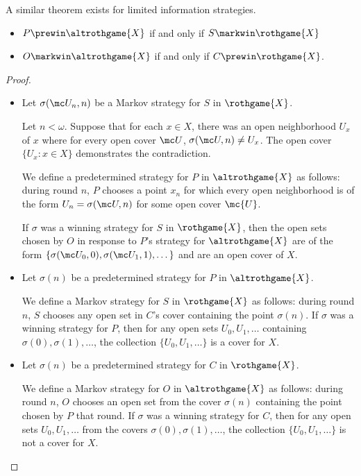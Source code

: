   A similar theorem exists for limited information strategies.

  \begin{thm}
    \begin{itemize}
      \item $P\prewin\altrothgame{X}$ if and only if $S\markwin\rothgame{X}$
      \item $O\markwin\altrothgame{X}$ if and only if $C\prewin\rothgame{X}$.
    \end{itemize}
  \end{thm}

  \begin{proof}

    \begin{itemize}
      \item
      Let $\sigma(\mc U_n,n)$ be a Markov strategy for $S$ in $\rothgame{X}$. 

      Let $n<\omega$. Suppose that for each $x\in X$, there was an open neighborhood $U_x$ of $x$ where for every open cover $\mc U$, $\sigma(\mc U,n)\not=U_x$. The open cover $\{U_x : x\in X\}$ demonstrates the contradiction.

      We define a predetermined strategy for $P$ in $\altrothgame{X}$ as follows: during round $n$, $P$ chooses a point $x_n$ for which every open neighborhood is of the form $U_n = \sigma(\mc U,n)$ for some open cover $\mc{U}$.

      If $\sigma$ was a winning strategy for $S$ in $\rothgame{X}$, then the open sets chosen by $O$ in response to $P$'s strategy for $\altrothgame{X}$ are of the form $\{\sigma(\mc U_0,0),\sigma(\mc U_1,1),\dots\}$ and are an open cover of $X$.

      \item
      Let $\sigma(n)$ be a predetermined strategy for $P$ in $\altrothgame{X}$.

      We define a Markov strategy for $S$ in $\rothgame{X}$ as follows: during round $n$, $S$ chooses any open set in $C$'s cover containing the point $\sigma(n)$. If $\sigma$ was a winning strategy for $P$, then for any open sets $U_0,U_1,\dots$ containing $\sigma(0),\sigma(1),\dots$, the collection $\{U_0,U_1,\dots\}$ is a cover for $X$.

      \item
      Let $\sigma(n)$ be a predetermined strategy for $C$ in $\rothgame{X}$.

      We define a Markov strategy for $O$ in $\altrothgame{X}$ as follows: during round $n$, $O$ chooses an open set from the cover $\sigma(n)$ containing the point chosen by $P$ that round. If $\sigma$ was a winning strategy for $C$, then for any open sets $U_0,U_1,\dots$ from the covers $\sigma(0),\sigma(1),\dots$, the collection $\{U_0,U_1,\dots\}$ is not a cover for $X$.


\end{itemize}
\end{proof}
